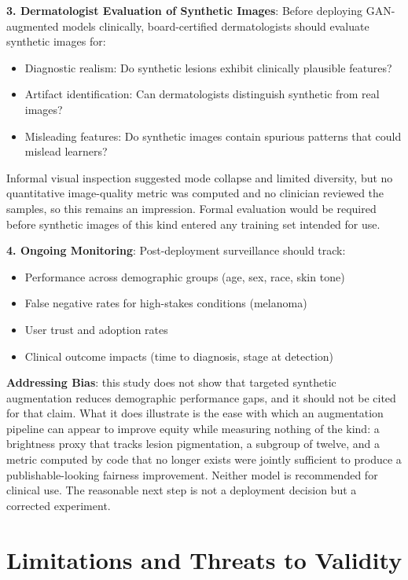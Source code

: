 \documentclass[ai,article,submit,pdftex,moreauthors]{Definitions/mdpi}
\begin{document}
\textbf{3. Dermatologist Evaluation of Synthetic Images}: Before deploying GAN-augmented models clinically, board-certified dermatologists should evaluate synthetic images for:
\begin{itemize}[leftmargin=*, itemsep=2pt]
    \item Diagnostic realism: Do synthetic lesions exhibit clinically plausible features?
    \item Artifact identification: Can dermatologists distinguish synthetic from real images?
    \item Misleading features: Do synthetic images contain spurious patterns that could mislead learners?
\end{itemize}

Informal visual inspection suggested mode collapse and limited diversity, but no quantitative image-quality metric was computed and no clinician reviewed the samples, so this remains an impression. Formal evaluation would be required before synthetic images of this kind entered any training set intended for use.

\textbf{4. Ongoing Monitoring}: Post-deployment surveillance should track:
\begin{itemize}[leftmargin=*, itemsep=2pt]
    \item Performance across demographic groups (age, sex, race, skin tone)
    \item False negative rates for high-stakes conditions (melanoma)
    \item User trust and adoption rates
    \item Clinical outcome impacts (time to diagnosis, stage at detection)
\end{itemize}

\textbf{Addressing Bias}: this study does not show that targeted synthetic augmentation reduces demographic performance gaps, and it should not be cited for that claim. What it does illustrate is the ease with which an augmentation pipeline can appear to improve equity while measuring nothing of the kind: a brightness proxy that tracks lesion pigmentation, a subgroup of twelve, and a metric computed by code that no longer exists were jointly sufficient to produce a publishable-looking fairness improvement. Neither model is recommended for clinical use. The reasonable next step is not a deployment decision but a corrected experiment.

\section{Limitations and Threats to Validity}
\label{sec:limitations}
\end{document}
